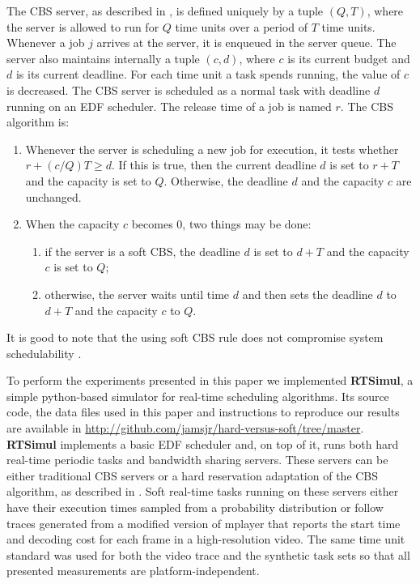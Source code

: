 \documentclass[times, 10pt,twocolumn]{article}
\newcommand{\simul}{\textbf{RTSimul}} %
\begin{document}
The CBS server, as described in \cite{abeni.ea98:integrating}, is
defined uniquely by a tuple $(Q,T)$, where the server is allowed to
run for $Q$ time units over a period of $T$ time units. Whenever a job
$j$ arrives at the server, it is enqueued in the server queue. The
server also maintains internally a tuple $(c,d)$, where $c$ is its
current budget and $d$ is its current deadline. For each time unit a
task spends running, the value of $c$ is decreased. The CBS server is
scheduled as a normal task with deadline $d$ running on an EDF
scheduler. The release time of a job is named $r$. The CBS algorithm
is:
\begin{enumerate}
\item Whenever the server is scheduling a new job for execution, it
  tests whether $r + (c/Q)T \geq d$. If this is true, then the current
  deadline $d$ is set to $r+T$ and the capacity is set to
  $Q$. Otherwise, the deadline $d$ and the capacity $c$ are unchanged.
\item When the capacity $c$ becomes $0$, two things may be done:
  \begin{enumerate}
  \item if the server is a soft CBS, the deadline $d$ is set to $d+T$
    and the capacity $c$ is set to $Q$;
  \item otherwise, the server waits until time $d$ and then sets the
    deadline $d$ to $d+T$ and the capacity $c$ to $Q$.
  \end{enumerate}
\end{enumerate}

It is good to note that the using soft CBS rule does not compromise
system schedulability \cite{abeni.ea98:integrating}.

\label{sec:simul-envir}

To perform the experiments presented in this paper we implemented
\simul{}, a simple python-based simulator for real-time scheduling
algorithms. Its source code, the data files used in this paper and
instructions to reproduce our results are available in
\url{http://github.com/jamsjr/hard-versus-soft/tree/master}. \simul{}
implements a basic EDF scheduler and, on top of it, runs both hard
real-time periodic tasks and bandwidth sharing servers. These servers
can be either traditional CBS servers \cite{abeni.ea98:integrating} or
a hard reservation adaptation of the CBS algorithm, as described in
\cite{buttazzo05:soft}. Soft real-time tasks running on these servers
either have their execution times sampled from a probability
distribution or follow traces generated from a modified version of
mplayer that reports the start time and decoding cost for each frame
in a high-resolution video. The same time unit standard was used for
both the video trace and the synthetic task sets so that all presented
measurements are platform-independent.
\end{document}

